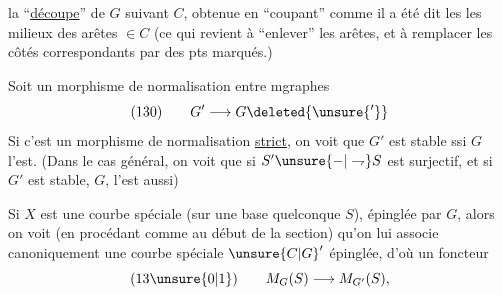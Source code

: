 la ``\uline{découpe}'' de $G$ suivant $C$, obtenue en ``coupant'' comme il a été dit les les milieux des arêtes $\in C$ (ce qui revient à ``enlever'' les arêtes, et à remplacer les côtés correspondants par des pts marqués.)

Soit un morphisme de normalisation entre mgraphes
\[
(130)\qquad G'\longrightarrow G\deleted{\unsure{'}}
\]
Si c'est un morphisme de normalisation \uline{strict}, on voit que $G'$ est stable ssi $G$ l'est. (Dans le cas général, on voit que si $S'\unsure{-|\rightharpoondown}S$ est surjectif, et si $G'$ est stable, $G$, l'est aussi)

 Si $X$ est une courbe spéciale (sur une base quelconque $S$), épinglée par $G$, alors on voit (en procédant comme au début de la section) qu'on lui associe canoniquement une courbe spéciale $\unsure{C|G}'$ épinglée, d'où un foncteur
\[
(13\unsure{0|1})\qquad M_G(S)\longrightarrow M_{G'}(S),
\]
